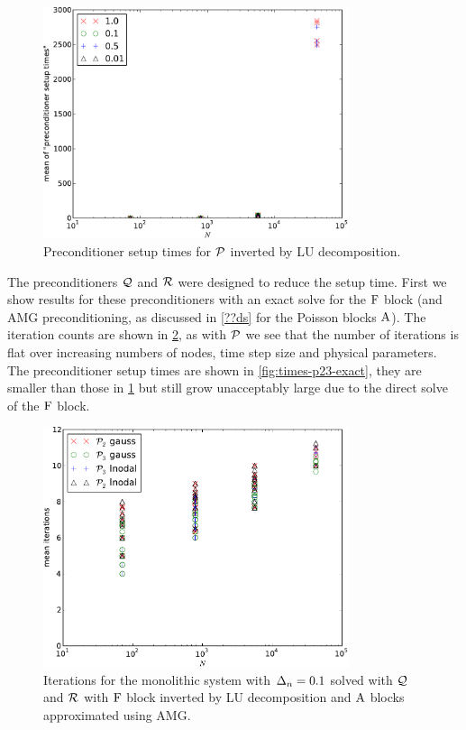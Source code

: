 \begin{figure}
  \centering
  \includegraphics[width=0.8\textwidth]{plots/linear_solvers/som-main-exactimplicitdummy-meanofpreconditionersetuptimesvsinitialnnode.pdf}
  \caption{Preconditioner setup times for $\mathcal{P}$ inverted by LU decomposition.}
  \label{fig:times-p1-exact}
\end{figure}

The preconditioners $\mathcal{Q}$ and $\mathcal{R}$ were designed to reduce the setup time.
First we show results for these preconditioners with an exact solve for the $\mathrm{F}$ block (and AMG preconditioning, as discussed in \cref{??ds} for the Poisson blocks $\mathrm{A}$).
The iteration counts are shown in \cref{fig:its-p23-exact}, as with $\mathcal{P}$ we see that the number of iterations is flat over increasing numbers of nodes, time step size and physical parameters.
The preconditioner setup times are shown in \cref{fig:times-p23-exact}, they are smaller than those in \cref{fig:times-p1-exact} but still grow unacceptably large due to the direct solve of the $\mathrm{F}$ block.

\begin{figure}
  \centering
  \includegraphics[width=0.8\textwidth]{plots/linear_solvers_p2p3/implicitexact-meanofnsolveritersvsinitialnnode.pdf}
  \caption{Iterations for the monolithic system with $\Delta_{n}=0.1$ solved with $\mathcal{Q}$ and $\mathcal{R}$ with $\mathrm{F}$ block inverted by LU decomposition and $\mathrm{A}$ blocks approximated using AMG.}
  \label{fig:its-p23-exact}
\end{figure}

